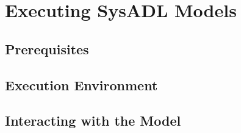 \chapter{Executing SysADL Models}
\section{Prerequisites}
\section{Execution Environment}
\section{Interacting with the Model}
